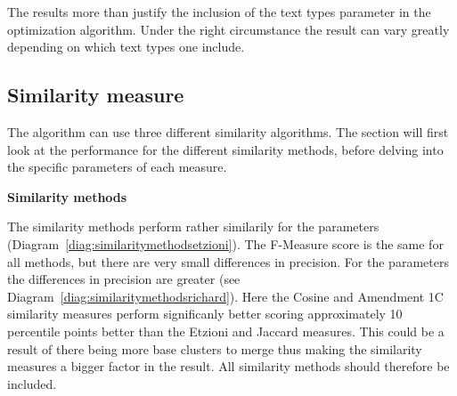 The results more than justify the inclusion of the text types parameter in the optimization algorithm. Under the right circumstance the result can vary greatly depending on which text types one include.

\subsection{Similarity measure}

The \CTC algorithm can use three different similarity algorithms. The section will first look at the performance for the different similarity methods, before delving into the specific parameters of each measure.

\textbf{Similarity methods}

The similarity methods perform rather similarily for the \citeauthor{Oren1998} parameters (Diagram~\ref{diag:similaritymethodsetzioni}). The F-Measure score is the same for all methods, but there are very small differences in precision. For the \citeauthor{Moe2013} parameters the differences in precision are greater (see Diagram~\ref{diag:similaritymethodsrichard}). Here the Cosine and Amendment 1C similarity measures perform significanly better scoring approximately 10 percentile points better than the Etzioni and Jaccard measures. This could be a result of there being more base clusters to merge thus making the similarity measures a bigger factor in the result. All similarity methods should therefore be included.

